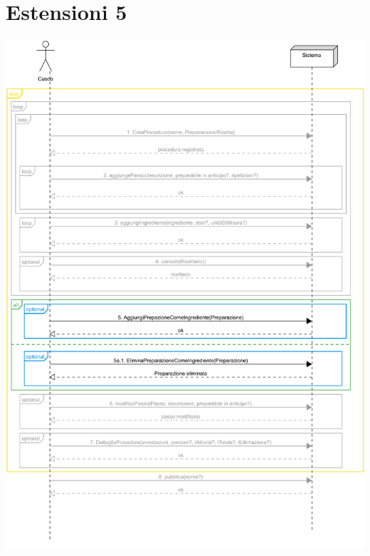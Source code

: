 \section*{Estensioni 5}
\includegraphics[max width=\textwidth, max height=190mm]{../resources/img/GRP/SSD/ext5.png}

